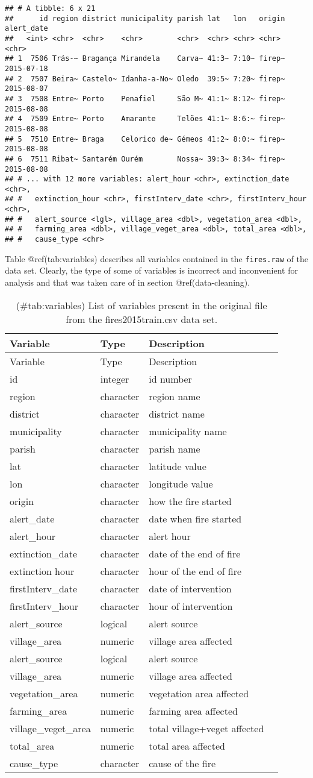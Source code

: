 \documentclass[
  12pt,
]{report}
\begin{document}
\begin{verbatim}
## # A tibble: 6 x 21
##      id region district municipality parish lat   lon   origin alert_date
##   <int> <chr>  <chr>    <chr>        <chr>  <chr> <chr> <chr>  <chr>     
## 1  7506 Trás-~ Bragança Mirandela    Carva~ 41:3~ 7:10~ firep~ 2015-07-18
## 2  7507 Beira~ Castelo~ Idanha-a-No~ Oledo  39:5~ 7:20~ firep~ 2015-08-07
## 3  7508 Entre~ Porto    Penafiel     São M~ 41:1~ 8:12~ firep~ 2015-08-08
## 4  7509 Entre~ Porto    Amarante     Telões 41:1~ 8:6:~ firep~ 2015-08-08
## 5  7510 Entre~ Braga    Celorico de~ Gémeos 41:2~ 8:0:~ firep~ 2015-08-08
## 6  7511 Ribat~ Santarém Ourém        Nossa~ 39:3~ 8:34~ firep~ 2015-08-08
## # ... with 12 more variables: alert_hour <chr>, extinction_date <chr>,
## #   extinction_hour <chr>, firstInterv_date <chr>, firstInterv_hour <chr>,
## #   alert_source <lgl>, village_area <dbl>, vegetation_area <dbl>,
## #   farming_area <dbl>, village_veget_area <dbl>, total_area <dbl>,
## #   cause_type <chr>
\end{verbatim}

Table @ref(tab:variables) describes all variables contained in the
\texttt{fires.raw} of the data set. Clearly, the type of some of
variables is incorrect and inconvenient for analysis and that was taken
care of in section @ref(data-cleaning).

\begin{longtable}[]{@{}llll@{}}
\caption{(\#tab:variables) List of variables present in the original
file from the fires2015train.csv data set.}\tabularnewline
\toprule
Variable & Type & Description &\tabularnewline
\midrule
\endfirsthead
\toprule
Variable & Type & Description &\tabularnewline
\midrule
\endhead
id & integer & id number &\tabularnewline
region & character & region name &\tabularnewline
district & character & district name &\tabularnewline
municipality & character & municipality name &\tabularnewline
parish & character & parish name &\tabularnewline
lat & character & latitude value &\tabularnewline
lon & character & longitude value &\tabularnewline
origin & character & how the fire started &\tabularnewline
alert\_date & character & date when fire started &\tabularnewline
alert\_hour & character & alert hour &\tabularnewline
extinction\_date & character & date of the end of fire &\tabularnewline
extinction hour & character & hour of the end of fire &\tabularnewline
firstInterv\_date & character & date of intervention &\tabularnewline
firstInterv\_hour & character & hour of intervention &\tabularnewline
alert\_source & logical & alert source &\tabularnewline
village\_area & numeric & village area affected &\tabularnewline
alert\_source & logical & alert source &\tabularnewline
village\_area & numeric & village area affected &\tabularnewline
vegetation\_area & numeric & vegetation area affected &\tabularnewline
farming\_area & numeric & farming area affected &\tabularnewline
village\_veget\_area & numeric & total village+veget affected
&\tabularnewline
total\_area & numeric & total area affected &\tabularnewline
cause\_type & character & cause of the fire &\tabularnewline
\bottomrule
\end{longtable}
\end{document}

